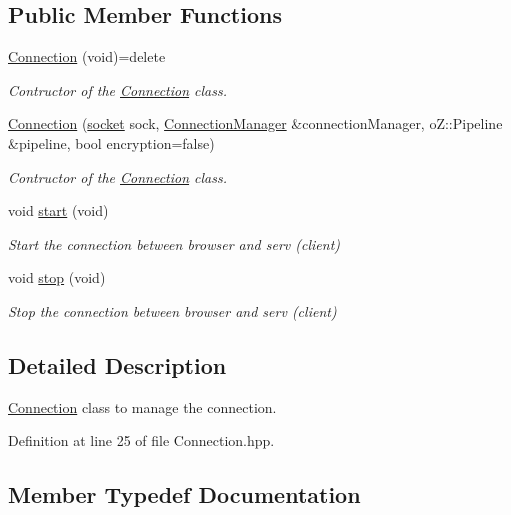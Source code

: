 \subsection*{Public Member Functions}
\begin{DoxyCompactItemize}
\item 
\hyperlink{class_zia_1_1_connection_a06a6c69bf205afa9868169a1435129c1}{Connection} (void)=delete
\begin{DoxyCompactList}\small\item\em Contructor of the \hyperlink{class_zia_1_1_connection}{Connection} class. \end{DoxyCompactList}\item 
\hyperlink{class_zia_1_1_connection_a61438cdd01805cd466d1382eafcb1576}{Connection} (\hyperlink{class_zia_1_1_connection_a1b74e276e0f3aa8dbabdaed80a0936e6}{socket} sock, \hyperlink{class_zia_1_1_connection_manager}{Connection\+Manager} \&connection\+Manager, o\+Z\+::\+Pipeline \&pipeline, bool encryption=false)
\begin{DoxyCompactList}\small\item\em Contructor of the \hyperlink{class_zia_1_1_connection}{Connection} class. \end{DoxyCompactList}\item 
void \hyperlink{class_zia_1_1_connection_af7bae27ea5870ef9efc6775d38012aa4}{start} (void)
\begin{DoxyCompactList}\small\item\em Start the connection between browser and serv (client) \end{DoxyCompactList}\item 
void \hyperlink{class_zia_1_1_connection_ac9704053c3b7f919d71255b1ce30cc63}{stop} (void)
\begin{DoxyCompactList}\small\item\em Stop the connection between browser and serv (client) \end{DoxyCompactList}\end{DoxyCompactItemize}


\subsection{Detailed Description}
\hyperlink{class_zia_1_1_connection}{Connection} class to manage the connection. 

Definition at line 25 of file Connection.\+hpp.



\subsection{Member Typedef Documentation}
\mbox{\label{class_zia_1_1_connection_a1b74e276e0f3aa8dbabdaed80a0936e6}} 
